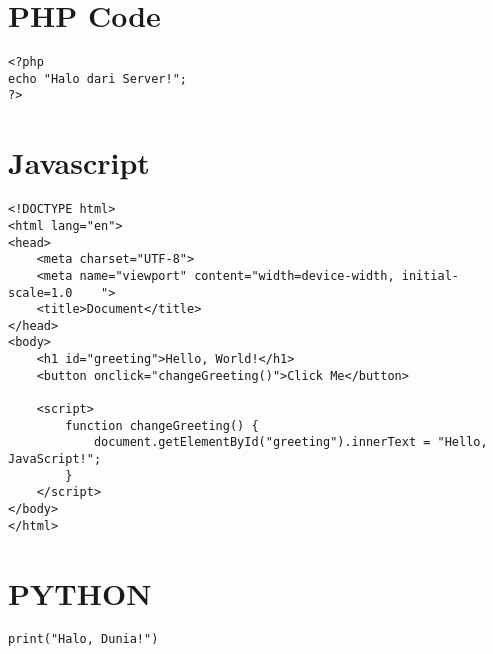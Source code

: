 \section{PHP Code}
\begin{minipage}{0.99\linewidth}
    \begin{lstlisting}[style=PHPStyle,caption={Endpoint PHP Minimalis},label={lst:php-simple}]
<?php
echo "Halo dari Server!";
?>
\end{lstlisting}
\end{minipage}


\section{Javascript}
\begin{minipage}{0.99\linewidth}
    \begin{lstlisting}[style=JavaScriptStyle,caption={Javascript Minimalis},label={lst:js-simple}]
<!DOCTYPE html>
<html lang="en">
<head>
    <meta charset="UTF-8">
    <meta name="viewport" content="width=device-width, initial-scale=1.0    ">
    <title>Document</title>
</head>
<body>
    <h1 id="greeting">Hello, World!</h1>
    <button onclick="changeGreeting()">Click Me</button>

    <script>
        function changeGreeting() {
            document.getElementById("greeting").innerText = "Hello, JavaScript!";
        }
    </script>
</body>
</html>
\end{lstlisting}
\end{minipage}

\section{PYTHON}
\begin{minipage}{0.99\linewidth}
    \begin{lstlisting}[style=PythonStyle,caption={Python Minimalis},label={lst:python-simple}]
        print("Halo, Dunia!")
    \end{lstlisting}
\end{minipage}


